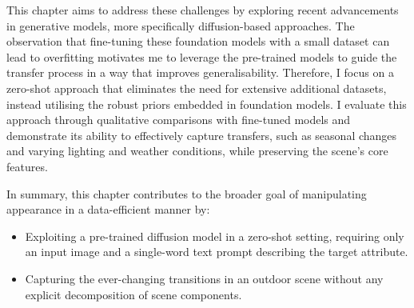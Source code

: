 This chapter aims to address these challenges by exploring recent advancements in generative models, more specifically diffusion-based approaches. The observation that fine-tuning these foundation models with a small dataset can lead to overfitting motivates me to leverage the pre-trained models to guide the transfer process in a way that improves generalisability. Therefore, I focus on a zero-shot approach that eliminates the need for extensive additional datasets, instead utilising the robust priors embedded in foundation models. I evaluate this approach through qualitative comparisons with fine-tuned models and demonstrate its ability to effectively capture transfers, such as seasonal changes and varying lighting and weather conditions, while preserving the scene's core features.


In summary, this chapter contributes to the broader goal of manipulating appearance in a data-efficient manner by:

\begin{itemize}

   \item Exploiting a pre-trained diffusion model in a zero-shot setting, requiring only an input image and a single-word text prompt describing the target attribute.
    
   \item Capturing the ever-changing transitions in an outdoor scene without any explicit decomposition of scene components.

\end{itemize}
